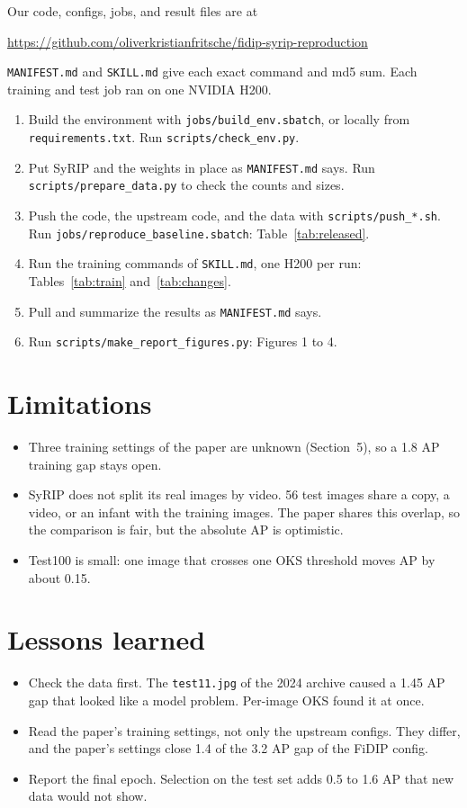 \documentclass[11pt]{article}
\newcommand{\code}[1]{\texttt{#1}}
\begin{document}
Our code, configs, jobs, and result files are at
\begin{center}\url{https://github.com/oliverkristianfritsche/fidip-syrip-reproduction}\end{center}
\code{MANIFEST.md} and \code{SKILL.md} give each exact command and md5 sum. Each training and test job ran on one NVIDIA H200.
\begin{enumerate}
  \item Build the environment with \code{jobs/build\_env.sbatch}, or locally from \code{requirements.txt}. Run \code{scripts/check\_env.py}.
  \item Put SyRIP and the weights in place as \code{MANIFEST.md} says. Run \code{scripts/prepare\_data.py} to check the counts and sizes.
  \item Push the code, the upstream code, and the data with \code{scripts/push\_*.sh}. Run \code{jobs/\allowbreak reproduce\_baseline.sbatch}: Table~\ref{tab:released}.
  \item Run the training commands of \code{SKILL.md}, one H200 per run: Tables~\ref{tab:train} and~\ref{tab:changes}.
  \item Pull and summarize the results as \code{MANIFEST.md} says.
  \item Run \code{scripts/make\_report\_figures.py}: Figures 1 to 4.
\end{enumerate}

\section{Limitations}

\begin{itemize}
  \item Three training settings of the paper are unknown (Section~5), so a 1.8 AP training gap stays open.
  \item SyRIP does not split its real images by video. 56 test images share a copy, a video, or an infant with the training images. The paper shares this overlap, so the comparison is fair, but the absolute AP is optimistic.
  \item Test100 is small: one image that crosses one OKS threshold moves AP by about 0.15.
\end{itemize}

\section{Lessons learned}

\begin{itemize}
  \item Check the data first. The \code{test11.jpg} of the 2024 archive caused a 1.45 AP gap that looked like a model problem. Per-image OKS found it at once.
  \item Read the paper's training settings, not only the upstream configs. They differ, and the paper's settings close 1.4 of the 3.2 AP gap of the FiDIP config.
  \item Report the final epoch. Selection on the test set adds 0.5 to 1.6 AP that new data would not show.
\end{itemize}
\end{document}
